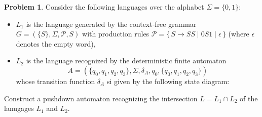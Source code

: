 \documentclass[a4paper,12pt]{article}
\theoremstyle{definition}
\newtheorem{problem}{Problem}
\begin{document}
\begin{problem}

    Consider the following languages over the alphabet $\Sigma = \{0,1\}$:
    \begin{itemize}
        \item $L_1$ is the language generated by the context-free grammar $G = (\{S\}, \Sigma, \mathcal P, S)$ with production rules $\mathcal P = \{\,S \rightarrow SS \mid 0S1 \mid \epsilon\,\}$ (where $\epsilon$ denotes the empty word),
        \item $L_2$ is the language recognized by the deterministic finite automaton 
        $$
        A=(\{q_0,q_1,q_2,q_3\},\Sigma,\delta_A,q_0,\{q_0,q_1,q_2,q_3\})
        $$        
        whose transition function $\delta_A$ si given by the following state diagram:
        \begin{center}
        \end{center}
        
    \end{itemize}
    Construct a pushdown automaton recognizing the intersection $L=L_1\cap L_2$ of the lanugages $L_1$ and $L_2$.

\end{problem}
\end{document}
